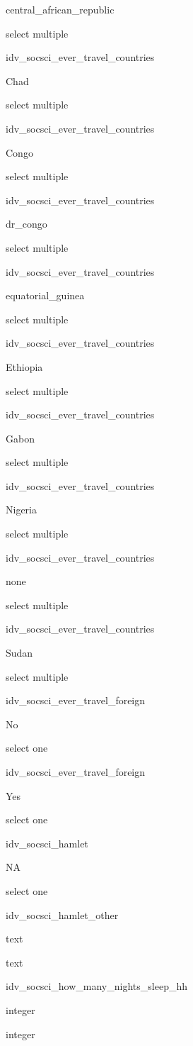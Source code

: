 \documentclass[]{article}
\begin{document}
central\_african\_republic

select multiple

idv\_socsci\_ever\_travel\_countries

Chad

select multiple

idv\_socsci\_ever\_travel\_countries

Congo

select multiple

idv\_socsci\_ever\_travel\_countries

dr\_congo

select multiple

idv\_socsci\_ever\_travel\_countries

equatorial\_guinea

select multiple

idv\_socsci\_ever\_travel\_countries

Ethiopia

select multiple

idv\_socsci\_ever\_travel\_countries

Gabon

select multiple

idv\_socsci\_ever\_travel\_countries

Nigeria

select multiple

idv\_socsci\_ever\_travel\_countries

none

select multiple

idv\_socsci\_ever\_travel\_countries

Sudan

select multiple

idv\_socsci\_ever\_travel\_foreign

No

select one

idv\_socsci\_ever\_travel\_foreign

Yes

select one

idv\_socsci\_hamlet

NA

select one

idv\_socsci\_hamlet\_other

text

text

idv\_socsci\_how\_many\_nights\_sleep\_hh

integer

integer
\end{document}
